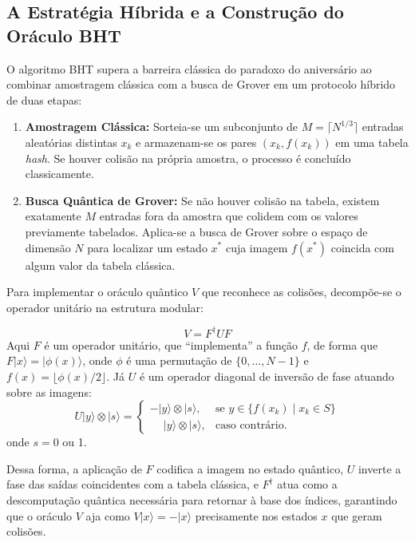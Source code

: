 \documentclass[12pt, a4paper]{article}
\newcommand{\ket}[1]{\lvert #1 \rangle}
\begin{document}
\subsection{A Estratégia Híbrida e a Construção do Oráculo BHT}

O algoritmo BHT supera a barreira clássica do paradoxo do aniversário ao combinar amostragem clássica com a busca de Grover em um protocolo híbrido de duas etapas:

\begin{enumerate}[label=\textbf{\arabic*.}]
    \item \textbf{Amostragem Clássica:} Sorteia-se um subconjunto de $M = \lceil N^{1/3} \rceil$ entradas aleatórias distintas $x_k$ e armazenam-se os pares $(x_k, f(x_k))$ em uma tabela \textit{hash}. Se houver colisão na própria amostra, o processo é concluído classicamente.
    \item \textbf{Busca Quântica de Grover:} Se não houver colisão na tabela, existem exatamente $M$ entradas fora da amostra que colidem com os valores previamente tabelados. Aplica-se a busca de Grover sobre o espaço de dimensão $N$ para localizar um estado $x^*$ cuja imagem $f(x^*)$ coincida com algum valor da tabela clássica.
\end{enumerate}

\begin{sloppypar}
Para implementar o oráculo quântico $V$ que reconhece as colisões, decompõe-se o operador unitário na estrutura modular:
\end{sloppypar}
\begin{equation}
    V = F^\dagger U F
\end{equation}
Aqui $F$ é um operador unitário, que ``implementa'' a função $f$, de forma que $F\ket{x} = \ket{\phi(x)}$, onde $\phi$ é uma permutação de $\{0, \dots, N-1\}$ e $f(x) = \lfloor\phi(x)/2\rfloor$. Já $U$ é um operador diagonal de inversão de fase atuando sobre as imagens:
\begin{equation}
    U\ket{y}\otimes\ket{s} = 
    \begin{cases} 
        -\ket{y}\otimes\ket{s}, & \text{se } y \in \{f(x_k) \mid x_k \in S\} \\
        \phantom{-}\ket{y}\otimes\ket{s}, & \text{caso contrário.}
    \end{cases}
\end{equation}
onde $s = 0$ ou 1.

Dessa forma, a aplicação de $F$ codifica a imagem no estado quântico, $U$ inverte a fase das saídas coincidentes com a tabela clássica, e $F^\dagger$ atua como a descomputação quântica necessária para retornar à base dos índices, garantindo que o oráculo $V$ aja como $V\ket{x} = -\ket{x}$ precisamente nos estados $x$ que geram colisões.
\end{document}
